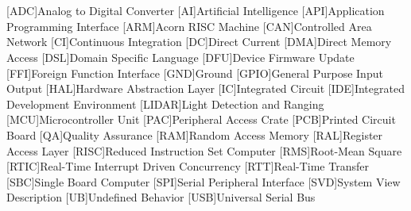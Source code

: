 \cleardoublepage
\chapter*{\listofabbrevname}
{}

\begin{acronym}[KolikMista]

	[ADC]{Analog to Digital Converter}
	[AI]{Artificial Intelligence}
	[API]{Application Programming Interface}
	[ARM]{Acorn RISC Machine}
	[CAN]{Controlled Area Network}
	[CI]{Continuous Integration}
	[DC]{Direct Current}
	[DMA]{Direct Memory Access}
	[DSL]{Domain Specific Language}
	[DFU]{Device Firmware Update}
	[FFI]{Foreign Function Interface}
	[GND]{Ground}
	[GPIO]{General Purpose Input Output}
	[HAL]{Hardware Abstraction Layer}
	[IC]{Integrated Circuit}
	[IDE]{Integrated Development Environment}
	[LIDAR]{Light Detection and Ranging}
	[MCU]{Microcontroller Unit}
	[PAC]{Peripheral Access Crate}
	[PCB]{Printed Circuit Board}
	[QA]{Quality Assurance}
	[RAM]{Random Access Memory}
	[RAL]{Register Access Layer}
	[RISC]{Reduced Instruction Set Computer}
	[RMS]{Root-Mean Square}
	[RTIC]{Real-Time Interrupt Driven Concurrency}
	[RTT]{Real-Time Transfer}
	[SBC]{Single Board Computer}
	[SPI]{Serial Peripheral Interface}
	[SVD]{System View Description}
	[UB]{Undefined Behavior}
	[USB]{Universal Serial Bus}


\end{acronym}

